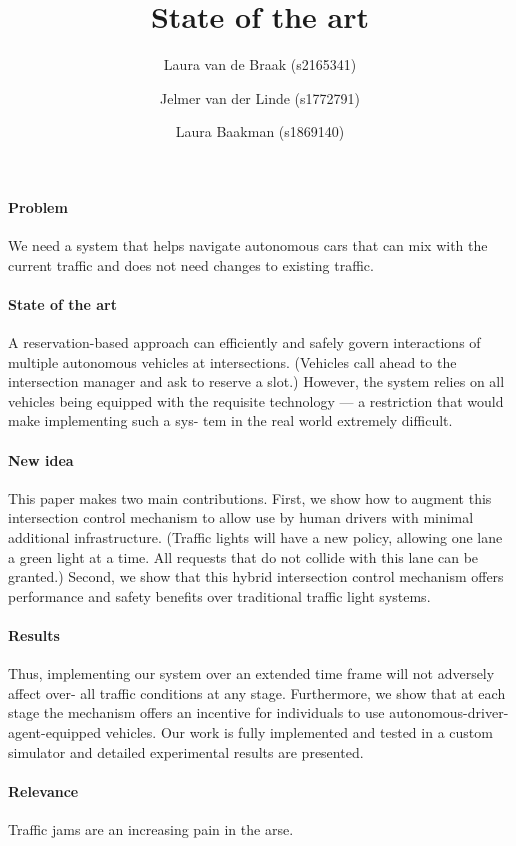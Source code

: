 \documentclass[a4paper]{article}
\title{State of the art\\ \sc{Sharing the Road: Autonomous Vehicles Meet Human Drivers}}
\author{%
	Laura van de Braak (s2165341) \and 
	Jelmer van der Linde (s1772791) \and 
	Laura Baakman (s1869140)
}
\begin{document}
\maketitle

\paragraph{Problem} We need a system that helps navigate autonomous cars that can mix with the current traffic and does not need changes to existing traffic.

\paragraph{State of the art} A reservation-based approach can efficiently and safely govern interactions of multiple autonomous vehicles at intersections. (Vehicles call ahead to the intersection manager and ask to reserve a slot.) However, the system relies on all vehicles being equipped with the requisite technology — a restriction that would make implementing such a sys- tem in the real world extremely difficult.

\paragraph{New idea} This paper makes two main contributions. First, we show how to augment this intersection control mechanism to allow use by human drivers with minimal additional infrastructure. (Traffic lights will have a new policy, allowing one lane a green light at a time. All requests that do not collide with this lane can be granted.) Second, we show that this hybrid intersection control mechanism offers performance and safety benefits over traditional traffic light systems. 

\paragraph{Results} Thus, implementing our system over an extended time frame will not adversely affect over- all traffic conditions at any stage. Furthermore, we show that at each stage the mechanism offers an incentive for individuals to use autonomous-driver-agent-equipped vehicles. Our work is fully implemented and tested in a custom simulator and detailed experimental results are presented.

\paragraph{Relevance} Traffic jams are an increasing pain in the arse.

\printbibliography
\end{document}

